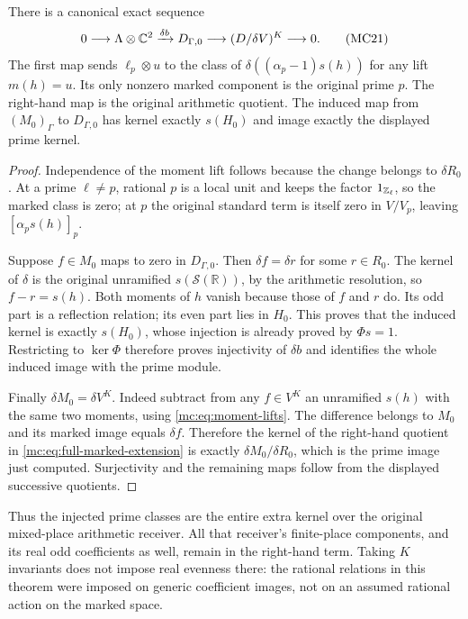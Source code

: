 \begin{theorem}
\label{mc:thm:marked-extension}
There is a canonical exact sequence
\[
 0\longrightarrow\Lambda\otimes\mathbb C^2
 \xrightarrow{\delta b}D_{\Gamma,0}
 \longrightarrow (D/\delta V)^K\longrightarrow0.
 \tag{MC21}\label{mc:eq:full-marked-extension}
\]
The first map sends $\ell_p\otimes u$ to the class of
$\delta((\alpha_p-1)s(h))$ for any lift $m(h)=u$. Its only
nonzero marked component is the original prime $p$. The right-hand
map is the original arithmetic quotient. The induced map from
$(M_0)_\Gamma$ to $D_{\Gamma,0}$ has kernel exactly $s(H_0)$
and image exactly the displayed prime kernel.
\end{theorem}
\begin{proof}
Independence of the moment lift follows because the change belongs
to $\delta R_0$. At a prime $\ell\ne p$, rational $p$ is a
local unit and keeps the factor $1_{\mathbb Z_\ell}$, so the marked
class is zero; at $p$ the original standard term is itself zero
in $V/V_p$, leaving $[\alpha_ps(h)]_p$.

Suppose $f\in M_0$ maps to zero in $D_{\Gamma,0}$. Then
$\delta f=\delta r$ for some $r\in R_0$. The kernel of
$\delta$ is the original unramified $s(\mathcal S(\mathbb R))$,
by the arithmetic resolution, so $f-r=s(h)$. Both moments of
$h$ vanish because those of $f$ and $r$ do. Its odd part is a
reflection relation; its even part lies in $H_0$. This proves
that the induced kernel is exactly $s(H_0)$, whose injection
is already proved by $\Phi s=1$. Restricting to $\ker\Phi$
therefore proves injectivity of $\delta b$ and identifies the
whole induced image with the prime module.

Finally $\delta M_0=\delta V^K$. Indeed subtract from any
$f\in V^K$ an unramified $s(h)$ with the same two moments,
using \eqref{mc:eq:moment-lifts}. The difference belongs to $M_0$
and its marked image equals $\delta f$. Therefore the kernel
of the right-hand quotient in \eqref{mc:eq:full-marked-extension}
is exactly $\delta M_0/\delta R_0$, which is the prime image
just computed. Surjectivity and the remaining maps follow from
the displayed successive quotients.
\end{proof}

Thus the injected prime classes are the entire extra kernel over
the original mixed-place arithmetic receiver. All that receiver's
finite-place components, and its real odd coefficients as well,
remain in the right-hand term. Taking $K$ invariants does not
impose real evenness there: the rational relations in this theorem
were imposed on generic coefficient images, not on an assumed
rational action on the marked space.


